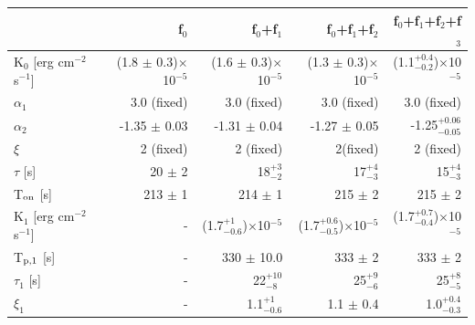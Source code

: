 \documentclass[preprint]{aastex631}
\begin{document}
\begin{table}[h!]
    \centering
    \begin{tabular}{l| r | r | r |  r }
         & f$_{0}$                                & f$_{0}$+f$_{1}$ & f$_{0}$+f$_{1}$+f$_{2}$ & f$_{0}$+f$_{1}$+f$_{2}$+f$_{3}$ \\
    \hline
    \hline
K$_{0}$ [erg cm$^{-2}$ s$^{-1}$]    & (1.8 $\pm$ 0.3)$\times$10$^{-5}$ & (1.6 $\pm$ 0.3)$\times$10$^{-5}$     & (1.3 $\pm$ 0.3)$\times$10$^{-5}$         & (1.1$^{+0.4}_{-0.2}$)$\times$10$^{-5}$    \\
$\alpha_{1}$                        &        3.0 (fixed)                  & 3.0 (fixed)                             & 3.0 (fixed)                                 & 3.0 (fixed)                                 \\
$\alpha_{2}$                        &     -1.35 $\pm$ 0.03              & -1.31 $\pm$ 0.04                      & -1.27 $\pm$ 0.05                          & -1.25$^{+0.06}_{-0.05}$                   \\
$\xi$                               &            2 (fixed)                 &  2 (fixed)                               &  2(fixed)                                   &  2 (fixed)                                   \\
$\tau$ [s]                          &       20 $\pm$ 2                  & 18$^{+3}_{-2}$                        & 17$^{+4}_{-3}$                            &  15$^{+4}_{-3}$                           \\
T$_{\rm on}$ [s]                    &          213 $\pm$ 1              & 214 $\pm$ 1                           & 215 $\pm$ 2                               & 215 $\pm$ 2                               \\
\hline
K$_{1}$ [erg cm$^{-2}$ s$^{-1}$]    &              -                    & (1.7$^{+1}_{-0.6}$)$\times$10$^{-5}$  & (1.7$^{+0.6}_{-0.5}$)$\times$10$^{-5}$      & (1.7$^{+0.7}_{-0.4}$)$\times$10$^{-5}$  \\
T$_{\rm p,1}$  [s]                  &              -                    &     330 $\pm$ 10.0                    & 333 $\pm$ 2                               & 333 $\pm$ 2                               \\
$\tau_1$       [s]                  &              -                    &           22$^{+10}_{-8}$             & 25$^{+9}_{-6}$                            & 25$^{+8}_{-5}$                            \\
$\xi_1$                             &              -                    &  1.1$^{+1}_{-0.6}$                    & 1.1 $\pm$ 0.4                             & 1.0$^{+0.4}_{-0.3}$                       \\

\end{tabular}
\end{table}
\end{document}

